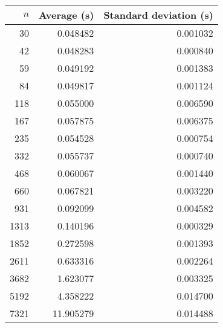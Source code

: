 \begin{tabular}{rrr}
$n$ & Average (s) & Standard deviation (s)\\\hline
30 & 0.048482 & 0.001032\\
42 & 0.048283 & 0.000840\\
59 & 0.049192 & 0.001383\\
84 & 0.049817 & 0.001124\\
118 & 0.055000 & 0.006590\\
167 & 0.057875 & 0.006375\\
235 & 0.054528 & 0.000754\\
332 & 0.055737 & 0.000740\\
468 & 0.060067 & 0.001440\\
660 & 0.067821 & 0.003220\\
931 & 0.092099 & 0.004582\\
1313 & 0.140196 & 0.000329\\
1852 & 0.272598 & 0.001393\\
2611 & 0.633316 & 0.002264\\
3682 & 1.623077 & 0.003325\\
5192 & 4.358222 & 0.014700\\
7321 & 11.905279 & 0.014488\\
\end{tabular}
